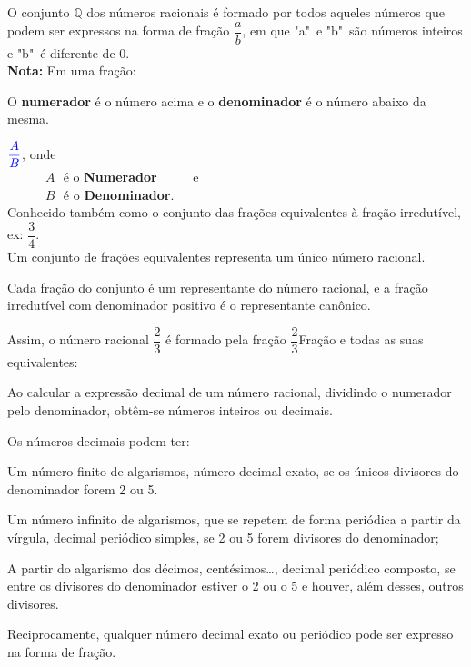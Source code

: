 \begin{multicols*}{2}
		O conjunto $\mathbb{Q} $ dos números racionais é formado por todos aqueles números que podem ser expressos na forma de fração $\dfrac{a}{b}$, em que "a"\ e "b"\ são números inteiros e "b"\ é diferente de 0.\\
		
		\textbf{\color{blue}Nota:} Em uma fração:
		
		O \textbf{\color{blue} numerador} é o número acima e o \textbf{\color{blue}denominador} é o número abaixo da mesma.
		
		$ \color{blue}\dfrac{A}{B} $, onde\\
		
		$\, \, \, \, \, \, \, \, \, \, \, \, \, \, \, \, \, \,A \, \, $ é o \textbf{\color{blue}Numerador} $\, \, \, \, \, \, \, \, \, \, \, \, \, $ e\\
		
		$\, \, \, \, \, \, \, \, \, \, \, \, \, \, \, \, \, \,B \, \, $ é o \textbf{\color{blue}Denominador}.\\
				
		Conhecido também como o conjunto das frações equivalentes à fração irredutível, ex: $\dfrac{3}{4}$.\\
	
		Um conjunto de frações equivalentes representa um único número racional.

		Cada fração do conjunto é um representante do número racional, e a fração irredutível com denominador positivo é o representante canônico.

		Assim, o número racional $\dfrac{2}{3} $ é formado pela fração $\dfrac{2}{3} $Fração e todas as suas equivalentes:
		
		Ao calcular a expressão decimal de um número racional, dividindo o numerador pelo denominador, obtêm-se números inteiros ou decimais.

		Os números decimais podem ter:

		Um número finito de algarismos, número decimal exato, se os únicos divisores do denominador forem 2 ou 5.
		
		Um número infinito de algarismos, que se repetem de forma periódica a partir da vírgula, decimal periódico simples, se 2 ou 5 forem divisores do denominador;
		
	A partir do algarismo dos décimos, centésimos…, decimal periódico composto, se entre os divisores do denominador estiver o 2 ou o 5 e houver, além desses, outros divisores.
	
Reciprocamente, qualquer número decimal exato ou periódico pode ser expresso na forma de fração.


\end{multicols*}
